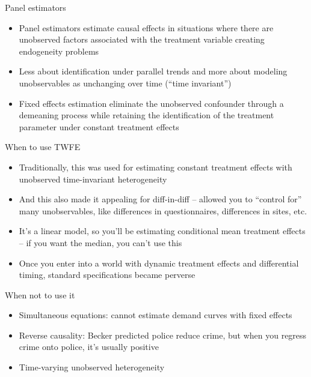 \documentclass{beamer}
\begin{document}
\begin{frame}{Panel estimators}

	\begin{itemize}
	\item Panel estimators estimate causal effects in situations where there are unobserved factors associated with the treatment variable creating endogeneity problems
	\item Less about identification under parallel trends and more about modeling unobservables as unchanging over time (``time invariant'')
	\item Fixed effects estimation eliminate the unobserved confounder through a demeaning process while retaining the identification of the treatment parameter under constant treatment effects
	\end{itemize}
\end{frame}


\begin{frame}{When to use TWFE}

\begin{itemize}
\item Traditionally, this was used for estimating constant treatment effects with unobserved time-invariant heterogeneity 
\item And this also made it appealing for diff-in-diff -- allowed you to ``control for'' many unobservables, like differences in questionnaires, differences in sites, etc.
\item It's a linear model, so you'll be estimating conditional mean treatment effects -- if you want the median, you can't use this
\item Once you enter into a world with dynamic treatment effects and differential timing, standard specifications became perverse
\end{itemize}

\end{frame}

\begin{frame}{When not to use it}

	\begin{itemize}
		\item Simultaneous equations: cannot estimate demand curves with fixed effects
		\item Reverse causality: Becker predicted police reduce crime, but when you regress crime onto police, it's usually positive 
		\item Time-varying unobserved heterogeneity
	\end{itemize}
	
\end{frame}
\end{document}
